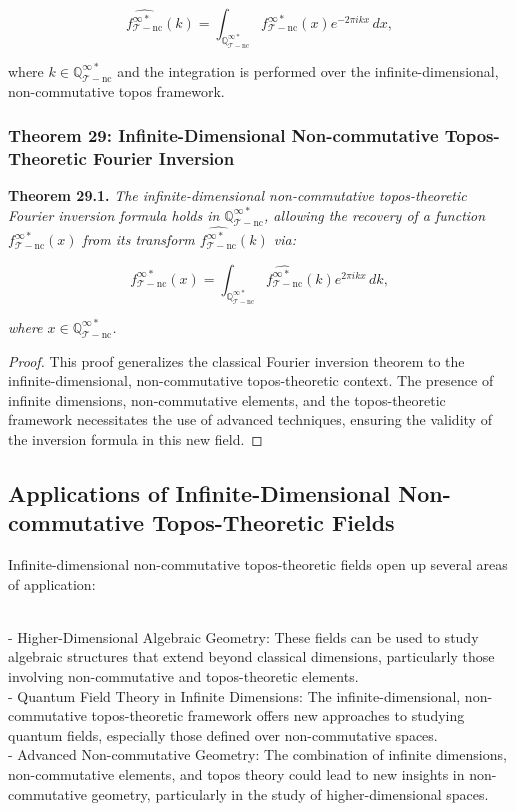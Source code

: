 \documentclass{article}
\begin{document}
\[
\widehat{f_{\mathcal{T}-\text{nc}}^{\infty *}}(k) = \int_{\mathbb{Q}_{\mathcal{T}-\text{nc}}^{\infty *}} f_{\mathcal{T}-\text{nc}}^{\infty *}(x) e^{-2\pi i k x} \, dx,
\]

where \(k \in \mathbb{Q}_{\mathcal{T}-\text{nc}}^{\infty *}\) and the integration is performed over the infinite-dimensional, non-commutative topos framework.

\subsubsection{Theorem 29: Infinite-Dimensional Non-commutative Topos-Theoretic Fourier Inversion}
\textbf{Theorem 29.1.} \textit{The infinite-dimensional non-commutative topos-theoretic Fourier inversion formula holds in \(\mathbb{Q}_{\mathcal{T}-\text{nc}}^{\infty *}\), allowing the recovery of a function \(f_{\mathcal{T}-\text{nc}}^{\infty *}(x)\) from its transform \(\widehat{f_{\mathcal{T}-\text{nc}}^{\infty *}}(k)\) via:}

\[
f_{\mathcal{T}-\text{nc}}^{\infty *}(x) = \int_{\mathbb{Q}_{\mathcal{T}-\text{nc}}^{\infty *}} \widehat{f_{\mathcal{T}-\text{nc}}^{\infty *}}(k) e^{2\pi i k x} \, dk,
\]

\textit{where \(x \in \mathbb{Q}_{\mathcal{T}-\text{nc}}^{\infty *}\).}

\begin{proof}
This proof generalizes the classical Fourier inversion theorem to the infinite-dimensional, non-commutative topos-theoretic context. The presence of infinite dimensions, non-commutative elements, and the topos-theoretic framework necessitates the use of advanced techniques, ensuring the validity of the inversion formula in this new field.
\end{proof}

\subsection{Applications of Infinite-Dimensional Non-commutative Topos-Theoretic Fields}
Infinite-dimensional non-commutative topos-theoretic fields open up several areas of application:

{\ }\\
- Higher-Dimensional Algebraic Geometry: These fields can be used to study algebraic structures that extend beyond classical dimensions, particularly those involving non-commutative and topos-theoretic elements.
{\ }\\
- Quantum Field Theory in Infinite Dimensions: The infinite-dimensional, non-commutative topos-theoretic framework offers new approaches to studying quantum fields, especially those defined over non-commutative spaces.
{\ }\\
- Advanced Non-commutative Geometry: The combination of infinite dimensions, non-commutative elements, and topos theory could lead to new insights in non-commutative geometry, particularly in the study of higher-dimensional spaces.
\end{document}
